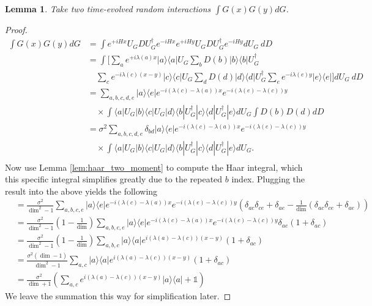 \documentclass{article}
\newtheorem{lemma}[theorem]{Lemma}
\newcommand{\ket}[1]{|#1\rangle}
\newcommand{\bra}[1]{\langle #1|}
\newcommand{\ketbra}[2]{| #1\rangle\! \langle #2|}
\newcommand{\parens}[1]{\left( #1 \right)}
\newcommand{\identity}{\mathds{1}}
\begin{document}
\begin{lemma} \label{lem:two_heisenberg_interactions}
    Take two time-evolved random interactions $\int G(x)G(y) dG$.
\end{lemma}
\begin{proof}
    \begin{align}
        \int G(x) G(y) dG &= \int e^{+i H x} U_G D U_G^\dagger e^{-i H x} e^{+i H y} U_G D U_G^\dagger e^{-i H y} dU_G ~dD \\
        &= \int \bigg[\sum_a e^{+i \lambda(a)x}\ketbra{a}{a}  U_G \sum_b D(b)\ketbra{b}{b} U_G^\dagger \nonumber \\
        &\quad \sum_c e^{-i \lambda(c) (x - y)} \ketbra{c}{c} U_G \sum_d D(d)\ketbra{d}{d} U_G^\dagger \sum_e e^{-i \lambda(e) y} \ketbra{e}{e} \bigg] dU_G ~dD\\
        &=\sum_{a,b,c,d,e} \ketbra{a}{e} e^{-i (\lambda(c) - \lambda(a))x} e^{-i (\lambda(e) - \lambda(c))y} \nonumber \\
        &\quad \times \int \bra{a} U_G \ket{b} \bra{c} U_G \ket{d} \bra{b} U_G^{\dagger} \ket{c} \bra{d} U_G^\dagger \ket{e} dU_G \int D(b) D(d) dD \\
        &= \sigma^2 \sum_{a, b, c, d, e} \delta_{bd} \ketbra{a}{e} e^{-i (\lambda(c) - \lambda(a))x} e^{-i (\lambda(e) - \lambda(c))y} \nonumber \\
        &\quad \times \int \bra{a} U_G \ket{b} \bra{c} U_G \ket{d} \bra{b} U_G^{\dagger} \ket{c} \bra{d} U_G^\dagger \ket{e} dU_G. \\
    \end{align}
    Now use Lemma \ref{lem:haar_two_moment} to compute the Haar integral, which this specific integral simplifies greatly due to the repeated $b$ index. Plugging the result into the above yields the following
    \begin{align}
        &= \frac{\sigma^2}{\dim^2 - 1} \sum_{a, b, c, e} \ketbra{a}{e} e^{-i (\lambda(c) - \lambda(a))x} e^{-i (\lambda(e) - \lambda(c))y} \parens{\delta_{ac} \delta_{ce} + \delta_{ae} - \frac{1}{\dim} \parens{\delta_{ac} \delta_{ce} + \delta_{ae}}}  \\
        &= \frac{\sigma^2}{\dim^2 - 1} \parens{1 - \frac{1}{\dim}} \sum_{a, b, c, e} \ketbra{a}{e} e^{-i (\lambda(c) - \lambda(a))x} e^{-i (\lambda(e) - \lambda(c))y} \delta_{ae} (1 + \delta_{ac}) \\
        &= \frac{\sigma^2}{\dim^2 - 1} \parens{1 - \frac{1}{\dim}} \sum_{a, b, c} \ketbra{a}{a} e^{i (\lambda(a) - \lambda(c))(x-y)} (1 + \delta_{ac}) \\
        &= \frac{\sigma^2 \parens{\dim - 1}}{\dim^2 - 1} \sum_{a,c} \ketbra{a}{a} e^{i (\lambda(a) - \lambda(c))(x - y)} (1 + \delta_{ac}) \\
        &= \frac{\sigma^2}{\dim + 1} \parens{\sum_{a,c} e^{i (\lambda(a) - \lambda(c))(x-y)} \ketbra{a}{a} + \identity}
    \end{align}
    We leave the summation this way for simplification later. 
\end{proof}
\end{document}
